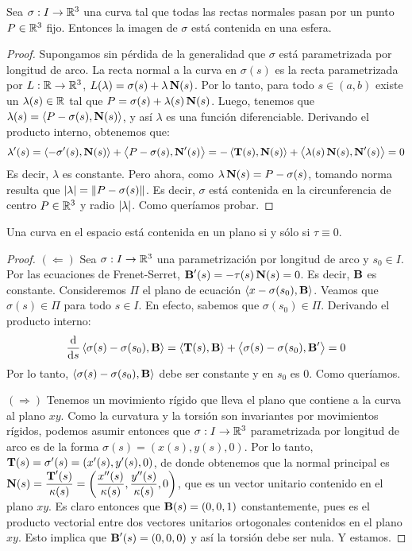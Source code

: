 \begin{prop}
Sea $\sigma:I\to\mathbb{R}^3$ una curva tal que todas las rectas normales pasan por un punto $P\in\mathbb{R}^3$ fijo. Entonces la imagen de $\sigma$ está contenida en una esfera.
\begin{proof}
Supongamos sin pérdida de la generalidad que $\sigma$ está parametrizada por longitud de arco. La recta normal a la curva en $\sigma(s)$ es la recta parametrizada por $L:\mathbb{R}\to\mathbb{R}^3$, $L(\lambda)=\sigma(s)+\lambda\operatorname{\mathbf{N}}(s)$. Por lo tanto, para todo $s\in(a,b)$ existe un $\lambda(s)\in\mathbb{R}$ tal que $P=\sigma(s)+\lambda(s)\operatorname{\mathbf{N}}(s)$. Luego, tenemos que $\lambda(s) = \left\langle P-\sigma(s),\operatorname{\mathbf{N}}(s) \right\rangle$, y así $\lambda$ es una función diferenciable. Derivando el producto interno, obtenemos que: $$\lambda'(s) = \left\langle -\sigma'(s),\operatorname{\mathbf{N}}(s) \right\rangle+\left\langle P-\sigma(s),\operatorname{\mathbf{N}}'(s) \right\rangle = -\left\langle \operatorname{\mathbf{T}}(s),\operatorname{\mathbf{N}}(s) \right\rangle+\left\langle \lambda(s)\operatorname{\mathbf{N}}(s),\operatorname{\mathbf{N}}'(s) \right\rangle = 0$$ Es decir, $\lambda$ es constante. Pero ahora, como $\lambda\operatorname{\mathbf{N}}(s)=P-\sigma(s)$, tomando norma resulta que $\left\lvert \lambda \right\rvert = \left\| P-\sigma(s) \right\|$. Es decir, $\sigma$ está contenida en la circunferencia de centro $P\in\mathbb{R}^3$ y radio $\left\lvert \lambda \right\rvert$. Como queríamos probar.
\end{proof}
\end{prop}

\begin{prop}
Una curva en el espacio está contenida en un plano si y sólo si $\tau\equiv 0$.
\begin{proof}
\hfill

$(\Longleftarrow)$ Sea $\sigma:I\to\mathbb{R}^3$ una parametrización por longitud de arco y $s_0\in I$. Por las ecuaciones de Frenet-Serret, $\operatorname{\mathbf{B}}'(s)=-\tau(s)\operatorname{\mathbf{N}}(s)=0$. Es decir, $\operatorname{\mathbf{B}}$ es constante. Consideremos $\Pi$ el plano de ecuación $\left\langle x-\sigma(s_0),\operatorname{\mathbf{B}} \right\rangle$. Veamos que $\sigma(s)\in\Pi$ para todo $s\in I$. En efecto, sabemos que $\sigma(s_0)\in\Pi$. Derivando el producto interno: $$\dfrac{\mathop{}\!\mathrm{d}}{\mathop{}\!\mathrm{d} s}\left\langle \sigma(s)-\sigma(s_0),\operatorname{\mathbf{B}} \right\rangle = \left\langle \operatorname{\mathbf{T}}(s),\operatorname{\mathbf{B}} \right\rangle + \left\langle \sigma(s)-\sigma(s_0),\operatorname{\mathbf{B}}' \right\rangle = 0$$ Por lo tanto, $\left\langle \sigma(s)-\sigma(s_0),\operatorname{\mathbf{B}} \right\rangle$ debe ser constante y en $s_0$ es $0$. Como queríamos.

$(\Longrightarrow)$ Tenemos un movimiento rígido que lleva el plano que contiene a la curva al plano $xy$. Como la curvatura y la torsión son invariantes por movimientos rígidos, podemos asumir entonces que $\sigma:I\to\mathbb{R}^3$ parametrizada por longitud de arco es de la forma $\sigma(s)=(x(s),y(s),0)$. Por lo tanto, $\operatorname{\mathbf{T}}(s)=\sigma'(s)=(x'(s),y'(s),0)$, de donde obtenemos que la normal principal es $\operatorname{\mathbf{N}}(s)=\dfrac{\operatorname{\mathbf{T}}'(s)}{\kappa(s)}=\left(\dfrac{x''(s)}{\kappa(s)},\dfrac{y''(s)}{\kappa(s)},0\right)$, que es un vector unitario contenido en el plano $xy$. Es claro entonces que $\operatorname{\mathbf{B}}(s) = (0,0,1)$ constantemente, pues es el producto vectorial entre dos vectores unitarios ortogonales contenidos en el plano $xy$. Esto implica que $\operatorname{\mathbf{B}}'(s)=(0,0,0)$ y así la torsión debe ser nula. Y estamos.
\end{proof}
\end{prop}

